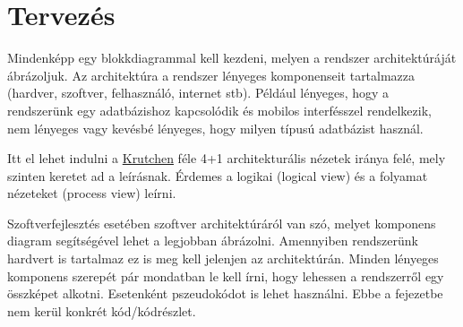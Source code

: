 \chapter{Tervezés	}
Mindenképp egy blokkdiagrammal kell kezdeni, melyen a rendszer architektúráját ábrázoljuk. Az architektúra a rendszer lényeges komponenseit tartalmazza (hardver, szoftver, felhasználó, internet stb). Például lényeges, hogy a rendszerünk egy adatbázishoz kapcsolódik és mobilos interfésszel rendelkezik, nem lényeges vagy kevésbé lényeges, hogy milyen típusú adatbázist használ.

Itt el lehet indulni a \href{https://en.wikipedia.org/wiki/4\%2B1_architectural_view_model}{Krutchen} féle 4+1 architekturális nézetek iránya felé, mely szinten keretet ad a leírásnak. Érdemes a logikai (logical view) és a folyamat nézeteket (process view) leírni.

Szoftverfejlesztés esetében szoftver architektúráról van szó, melyet komponens diagram segítségével lehet a legjobban ábrázolni.  Amennyiben rendszerünk hardvert is tartalmaz ez is meg kell jelenjen az architektúrán.
Minden lényeges komponens szerepét pár mondatban le kell írni, hogy lehessen a rendszerről egy összképet alkotni. Esetenként pszeudokódot is lehet használni. Ebbe a fejezetbe nem kerül konkrét kód/kódrészlet. 

